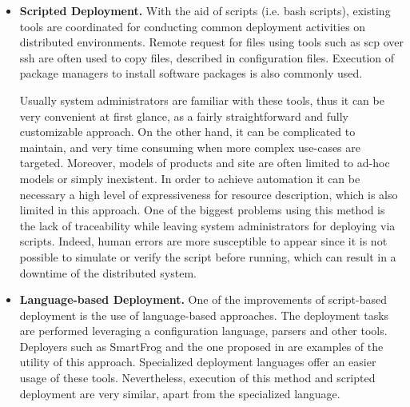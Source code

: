 \begin{itemize}
	\item \textbf{Scripted Deployment.} With the aid of scripts (i.e. bash scripts), existing tools are coordinated for conducting common deployment activities on distributed environments.
	Remote request for files using tools such as scp over ssh are often used to copy files, described in configuration files.
	Execution of package managers to install software packages is also commonly used.
	
	Usually system administrators are familiar with these tools, thus it can be very convenient at first glance, as a fairly straightforward and fully customizable approach.
	On the other hand, it can be complicated to maintain, and very time consuming when more complex use-cases are targeted.
	Moreover, models of products and site are often limited to ad-hoc models or simply inexistent.
	In order to achieve automation it can be necessary a high level of expressiveness for resource description, which is also limited in this approach.
	One of the biggest problems using this method is the lack of traceability while leaving system administrators for deploying via scripts.
	Indeed, human errors are more susceptible to appear since it is not possible to simulate or verify the script before running, which can result in a downtime of the distributed system.
	
	\item \textbf{Language-based Deployment.} One of the improvements of script-based deployment is the use of language-based approaches.
	The deployment tasks are performed leveraging a configuration language, parsers and other tools.
	Deployers such as SmartFrog\cite{goldsack2003smartfrog} and the one proposed in  \cite{wang2006language} are examples of the utility of this approach.
	Specialized deployment languages offer an easier usage of these tools.
	Nevertheless, execution of this method and scripted deployment are very similar, apart from the specialized language.
	

\end{itemize}
